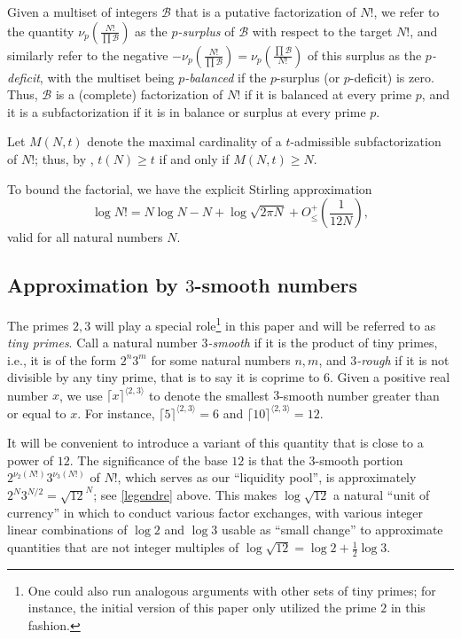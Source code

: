 \documentclass[10pt,a4paper,reqno]{amsart}
\numberwithin{equation}{section}
\theoremstyle{plain}
\theoremstyle{definition}
\newcommand\tuple{{\mathcal B}}
\begin{document}
Given a multiset of integers $\tuple$ that is a putative factorization of $N!$,
we refer to the quantity $\nu_p\left( \frac{N!}{\prod \tuple} \right)$ as the \emph{$p$-surplus} of $\tuple$ with respect to the target $N!$, and similarly refer to the negative $-\nu_p\left( \frac{N!}{\prod \tuple} \right) = \nu_p\left( \frac{\prod \tuple}{N!} \right)$ of this surplus as the \emph{$p$-deficit}, with the multiset being \emph{$p$-balanced} if the $p$-surplus (or $p$-deficit) is zero.  Thus, $\tuple$ is a (complete) factorization of $N!$ if it is balanced at every prime $p$, and it is a subfactorization if it is in balance or surplus at every prime $p$.

Let $M(N,t)$ denote the maximal cardinality of a $t$-admissible subfactorization of $N!$; thus, by , $t(N) \geq t$ if and only if $M(N,t) \geq N$.

To bound the factorial, we have the explicit Stirling approximation \cite{robbins}
\begin{equation}\label{stirling}
\log N! = N \log N - N + \log \sqrt{2\pi N} + O_\leq^+\left(\frac{1}{12N}\right),
\end{equation}
valid for all natural numbers $N$.

\subsection{Approximation by \texorpdfstring{$3$}{3}-smooth numbers}

The primes $2,3$ will play a special role\footnote{One could also run analogous arguments with other sets of tiny primes; for instance, the initial version \cite{tao} of this paper only utilized the prime $2$ in this fashion.} in this paper and will be referred to as \emph{tiny primes}.
Call a natural number \emph{$3$-smooth} if it is the product of tiny primes, i.e., it is of the form $2^n 3^m$ for some natural numbers $n,m$, and \emph{$3$-rough} if it is not divisible by any tiny prime, that is to say it is coprime to $6$.  Given a positive real number $x$, we use $\lceil x \rceil^{\langle 2,3 \rangle}$ to denote the smallest $3$-smooth number greater than or equal to $x$.  For instance, $\lceil 5 \rceil^{\langle 2,3 \rangle} = 6$ and $\lceil 10 \rceil^{\langle 2,3 \rangle} = 12$.

It will be convenient to introduce a variant of this quantity that is close to a power of $12$. The significance of the base $12$ is that the $3$-smooth portion $2^{\nu_2(N!)} 3^{\nu_3(N!)}$ of $N!$, which serves as our ``liquidity pool'', is approximately $2^N 3^{N/2} = \sqrt{12}^{N}$; see \eqref{legendre} above.  This makes $\log \sqrt{12}$ a natural ``unit of currency'' in which to conduct various factor exchanges, with various integer linear combinations of $\log 2$ and $\log 3$ usable as ``small change'' to approximate quantities that are not integer multiples of $\log \sqrt{12} = \log 2 + \frac{1}{2} \log 3$.
\end{document}
